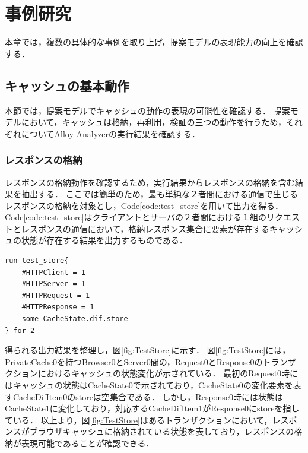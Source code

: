 \documentclass[12pt,a4paper]{jbook}
\begin{document}
\newpage

\chapter{事例研究}
本章では，複数の具体的な事例を取り上げ，提案モデルの表現能力の向上を確認する．

\section{キャッシュの基本動作}
本節では，提案モデルでキャッシュの動作の表現の可能性を確認する．
提案モデルにおいて，キャッシュは格納，再利用，検証の三つの動作を行うため，それぞれについてAlloy Analyzerの実行結果を確認する．

\subsection{レスポンスの格納}
レスポンスの格納動作を確認するため，実行結果からレスポンスの格納を含む結果を抽出する．
ここでは簡単のため，最も単純な２者間における通信で生じるレスポンスの格納を対象とし，Code\ref{code:test_store}を用いて出力を得る．
Code\ref{code:test_store}はクライアントとサーバの２者間における１組のリクエストとレスポンスの通信において，格納レスポンス集合に要素が存在するキャッシュの状態が存在する結果を出力するものである．

\begin{lstlisting}[caption=レスポンスの格納, label=code:test_store]
run test_store{
	#HTTPClient = 1
	#HTTPServer = 1
	#HTTPRequest = 1
	#HTTPResponse = 1
	some CacheState.dif.store
} for 2
\end{lstlisting}

得られる出力結果を整理し，図\ref{fig:TestStore}に示す．
図\ref{fig:TestStore}には，PrivateCache0を持つBrowser0とServer0間の，Request0とResponse0のトランザクションにおけるキャッシュの状態変化が示されている．
最初のRequest0時にはキャッシュの状態はCacheState0で示されており，CacheState0の変化要素を表すCacheDifItem0のstoreは空集合である．
しかし，Response0時には状態はCacheState1に変化しており，対応するCacheDifItem1がResponse0にstoreを指している．
以上より，図\ref{fig:TestStore}はあるトランザクションにおいて，レスポンスがブラウザキャッシュに格納されている状態を表しており，レスポンスの格納が表現可能であることが確認できる．
\end{document}
